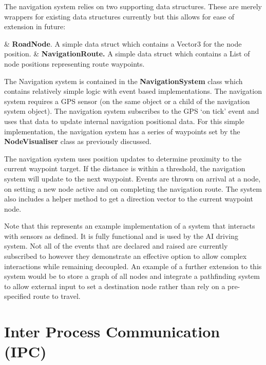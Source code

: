 \documentclass{article}
\begin{document}
The navigation system relies on two supporting data structures. These are merely wrappers for existing data structures currently but this allows for ease of extension in future: 
\begin{easylist}
	& \textbf{RoadNode}. A simple data struct which contains a Vector3 for the node position.
	& \textbf{NavigationRoute.}  A simple data struct which contains a List of node positions representing route waypoints.
\end{easylist}

The Navigation system is contained in the \textbf{NavigationSystem} class which contains relatively simple logic with event based implementations. The navigation system requires a GPS sensor (on the same object or a child of the navigation system object). The navigation system subscribes to the GPS `on tick' event and uses that data to update internal navigation positional data. For this simple implementation, the navigation system has a series of waypoints set by the \textbf{NodeVisualiser} class as previously discussed.

The navigation system uses position updates to determine proximity to the current waypoint target. If the distance is within a threshold, the navigation system will update to the next waypoint. Events are thrown on arrival at a node, on setting a new node active and on completing the navigation route. The system also includes a helper method to get a direction vector to the current waypoint node.

Note that this represents an example implementation of a system that interacts with sensors as defined. It is fully functional and is used by the AI driving system. Not all of the events that are declared and raised are currently subscribed to however they demonstrate an effective option to allow complex interactions while remaining decoupled. An example of a further extension to this system would be to store a graph of all nodes and integrate a pathfinding system to allow external input to set a destination node rather than rely on a pre-specified route to travel.

\section{Inter Process Communication (IPC)}\label{s:ipc}
\end{document}
